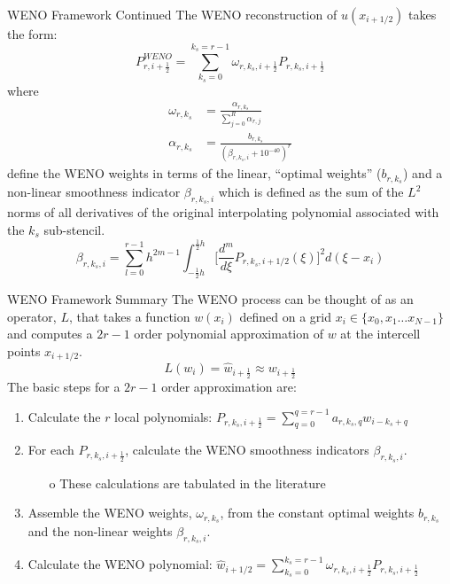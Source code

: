 \documentclass[9pt]{beamer}
\begin{document}
\begin{frame}{WENO Framework Continued}
  The WENO reconstruction of $u(x_{i+1/2})$ takes the form:
  \begin{equation}
    P^{WENO}_{r,i+\frac{1}{2}}=\sum_{k_s=0}^{k_s=r-1}\omega_{r,k_s,i+\frac{1}{2}}P_{r,k_s,i+\frac{1}{2}}\label{eq:WenoEquation}
  \end{equation}
  where 
  \begin{align}
    \omega_{r,k_s}&=\frac{\alpha_{r,k_s}}{\sum_{j=0}^R\alpha_{r,j}}\\
    \alpha_{r,k_s}&=\frac{b_{r,k_s}}{(\beta_{r,k_s,i} +10^{-40})^r}
  \end{align}
  define the WENO weights in terms of the linear, ``optimal weights'' ($b_{r,k_s}$) and a non-linear smoothness indicator $\beta_{r,k_s,i}$ which is defined as the sum of the $L^2$ norms of all derivatives of the original interpolating polynomial associated with the $k_s$ sub-stencil. 
  \begin{equation}
    \beta_{r,k_s,i} = \sum_{l=0}^{r-1}h^{2m-1}\int_{-\frac{1}{2}h}^{\frac{1}{2}h}\bigg[\frac{d^m}{d\xi}P_{r,k_s,i+1/2}(\xi)\bigg]^2d(\xi-x_i)\label{eq:OptimalCoefficients}
  \end{equation}
\end{frame}

\begin{frame}{WENO Framework Summary}
  The WENO process can be thought of as an operator, $L$, that takes a function $w(x_i)$ defined on a grid $x_i \in \{x_0, x_1 \dots x_{N-1}
  \}$ and computes a $2r-1$ order polynomial approximation of $w$ at the intercell points $x_{i+1/2}$.
  $$L(w_{i}) = \hat{w}_{{i+\frac{1}{2}}}\approx w_{{i+\frac{1}{2}}}$$
  The basic steps for a $2r-1$ order approximation are:
  \begin{enumerate}
    \item Calculate the $r$ local polynomials: $P_{r,k_s,i+\frac{1}{2}}= \sum_{q=0}^{q=r-1}a_{r,k_s,q}w_{i-k_s+q}$
    \item For each $P_{r,k_s,i+\frac{1}{2}}$, calculate the WENO smoothness indicators $\beta_{r,k_s,i}$.
    \begin{itemize}
      \item[o] These calculations are tabulated in the literature
    \end{itemize}
    \item Assemble the WENO weights, $\omega_{r,k_s}$, from the constant optimal weights $b_{r,k_s}$ and the non-linear weights $\beta_{r,k_s,i}$. 
    \item Calculate the WENO polynomial: $\hat{w}_{i+1/2}=\sum_{k_s=0}^{k_s=r-1}\omega_{r,k_s,i+\frac{1}{2}}P_{r,k_s,i+\frac{1}{2}}$
  \end{enumerate}
\end{frame}
\end{document}
